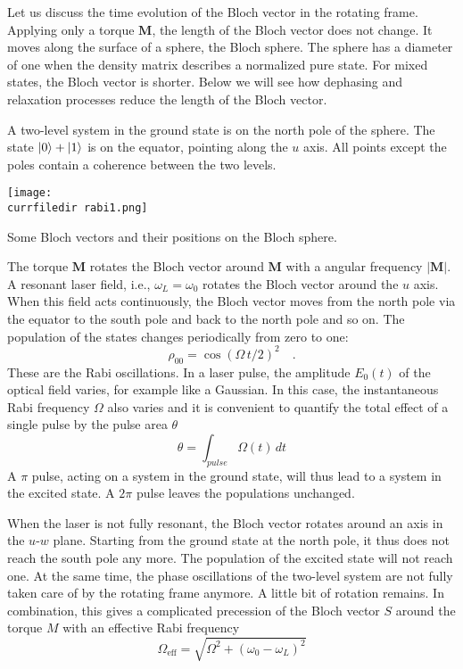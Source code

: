 Let us discuss the time evolution of the Bloch vector in the rotating frame. Applying only a torque $\boldsymbol{M}$, the length of the Bloch vector does not change. It moves along the surface of a sphere, the Bloch sphere. The sphere has a diameter of one when the density matrix describes a normalized pure state. For mixed states, the Bloch vector is shorter. Below we will see how dephasing and relaxation processes reduce the length of the Bloch vector.


A two-level system in the ground state is on the north pole of the sphere. The state $\ket{0} + \ket{1}$ is on the equator, pointing along the $u$ axis. All points except the poles contain a coherence between the two levels.


\begin{marginfigure}
\centering
\texttt{[image: \\currfiledir rabi1.png]}
\caption{Some Bloch vectors and their positions on the Bloch sphere.}
\end{marginfigure}


The torque $\boldsymbol{M}$ rotates the Bloch vector around  $\boldsymbol{M}$ with a angular frequency  $|\boldsymbol{M}|$. A resonant laser field, i.e., $\omega_L = \omega_0$ rotates the Bloch vector around the $u$ axis. When this field acts continuously, the Bloch vector moves from the north pole via the equator to the south pole and back to the north pole and so on. The population of the states changes periodically from zero to one:
\[
 \rho_{00} = \cos ( \Omega \, t / 2)^2 \quad .
\]
These are the Rabi oscillations. In a laser pulse, the amplitude $E_0(t)$ of the optical field varies, for example like a Gaussian. In this case, the instantaneous Rabi frequency $\Omega$ also varies and it is convenient to quantify the total effect of a single pulse by the pulse area $\theta$
\[
 \theta = \int_{pulse} \Omega (t) \, dt
\]
A $\pi$ pulse, acting on a system in the ground state, will thus lead to a system in the excited state. A $2\pi$ pulse leaves the populations unchanged.



When the laser is not fully resonant, the Bloch vector rotates around an axis in the $u$-$w$ plane. Starting from the ground state at the north pole, it thus does not reach the south pole any more. The population of the excited state will  not reach one. At the same time, the phase oscillations of the two-level system are not fully taken care of by the rotating frame anymore. A little bit of rotation remains. In combination, this gives a complicated precession of the Bloch vector $S$ around the torque $M$ with an effective Rabi frequency 
\[
 \Omega_\text{eff} = \sqrt{\Omega^2 + (\omega_0 - \omega_L)^2 }
\]

